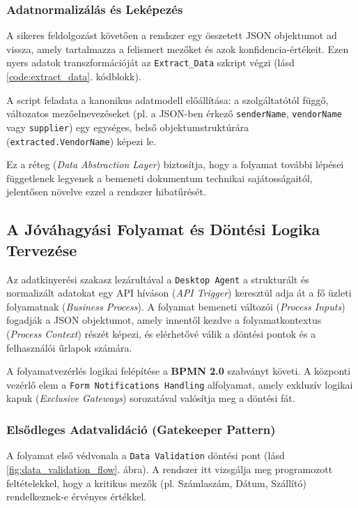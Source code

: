 \subsubsection{Adatnormalizálás és Leképezés}

A sikeres feldolgozást követően a rendszer egy összetett JSON objektumot ad vissza, amely tartalmazza a felismert mezőket és azok konfidencia-értékeit. Ezen nyers adatok transzformációját az \texttt{Extract\_Data} szkript végzi (lásd \ref{code:extract_data}. kódblokk).

A script feladata a kanonikus adatmodell előállítása: a szolgáltatótól függő, változatos mezőelnevezéseket (pl. a JSON-ben érkező \texttt{senderName}, \texttt{vendorName} vagy \texttt{supplier}) egy egységes, belső objektumstruktúrára (\texttt{extracted.VendorName}) képezi le.

Ez a réteg (\textit{Data Abstraction Layer}) biztosítja, hogy a folyamat további lépései függetlenek legyenek a bemeneti dokumentum technikai sajátosságaitól, jelentősen növelve ezzel a rendszer hibatűrését.


\subsection{A Jóváhagyási Folyamat és Döntési Logika Tervezése}
\label{ssec:approval_logic_design}

Az adatkinyerési szakasz lezárultával a \texttt{Desktop Agent} a strukturált és normalizált adatokat egy API híváson (\textit{API Trigger}) keresztül adja át a fő üzleti folyamatnak (\textit{Business Process}). A folyamat bemeneti változói (\textit{Process Inputs}) fogadják a JSON objektumot, amely innentől kezdve a folyamatkontextus (\textit{Process Context}) részét képezi, és elérhetővé válik a döntési pontok és a felhasználói űrlapok számára.

A folyamatvezérlés logikai felépítése a \textbf{BPMN 2.0} szabványt követi. A központi vezérlő elem a \texttt{Form Notifications Handling} alfolyamat, amely exkluzív logikai kapuk (\textit{Exclusive Gateways}) sorozatával valósítja meg a döntési fát.

\subsubsection{Elsődleges Adatvalidáció (Gatekeeper Pattern)}

A folyamat első védvonala a \texttt{Data Validation} döntési pont (lásd \ref{fig:data_validation_flow}. ábra). A rendszer itt vizsgálja meg programozott feltételekkel, hogy a kritikus mezők (pl. Számlaszám, Dátum, Szállító) rendelkeznek-e érvényes értékkel.

